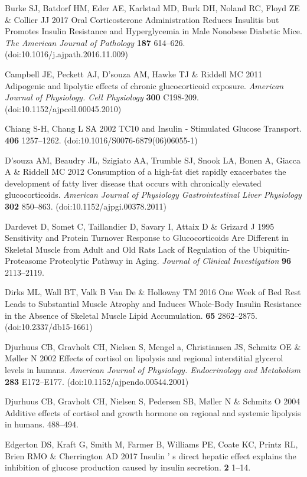 \documentclass[11pt]{article} %
\begin{document}
Burke SJ, Batdorf HM, Eder AE, Karlstad MD, Burk DH, Noland RC, Floyd ZE
\& Collier JJ 2017 Oral Corticosterone Administration Reduces Insulitis
but Promotes Insulin Resistance and Hyperglycemia in Male Nonobese
Diabetic Mice. \emph{The American Journal of Pathology} \textbf{187}
614--626. (doi:10.1016/j.ajpath.2016.11.009)

Campbell JE, Peckett AJ, D'souza AM, Hawke TJ \& Riddell MC 2011
Adipogenic and lipolytic effects of chronic glucocorticoid exposure.
\emph{American Journal of Physiology. Cell Physiology} \textbf{300}
C198-209. (doi:10.1152/ajpcell.00045.2010)

Chiang S-H, Chang L SA 2002 TC10 and Insulin ‐ Stimulated Glucose
Transport. \textbf{406} 1257--1262. (doi:10.1016/S0076-6879(06)06055-1)

D'souza AM, Beaudry JL, Szigiato AA, Trumble SJ, Snook LA, Bonen A,
Giacca A \& Riddell MC 2012 Consumption of a high-fat diet rapidly
exacerbates the development of fatty liver disease that occurs with
chronically elevated glucocorticoids. \emph{American Journal of
Physiology Gastrointestinal Liver Physiology} \textbf{302} 850--863.
(doi:10.1152/ajpgi.00378.2011)

Dardevet D, Somet C, Taillandier D, Savary I, Attaix D \& Grizard J 1995
Sensitivity and Protein Turnover Response to Glucocorticoids Are
Different in Skeletal Muscle from Adult and Old Rats Lack of Regulation
of the Ubiquitin-Proteasome Proteolytic Pathway in Aging. \emph{Journal
of Clinical Investigation} \textbf{96} 2113--2119.

Dirks ML, Wall BT, Valk B Van De \& Holloway TM 2016 One Week of Bed
Rest Leads to Substantial Muscle Atrophy and Induces Whole-Body Insulin
Resistance in the Absence of Skeletal Muscle Lipid Accumulation.
\textbf{65} 2862--2875. (doi:10.2337/db15-1661)

Djurhuus CB, Gravholt CH, Nielsen S, Mengel a, Christiansen JS, Schmitz
OE \& Møller N 2002 Effects of cortisol on lipolysis and regional
interstitial glycerol levels in humans. \emph{American Journal of
Physiology. Endocrinology and Metabolism} \textbf{283} E172--E177.
(doi:10.1152/ajpendo.00544.2001)

Djurhuus CB, Gravholt CH, Nielsen S, Pedersen SB, Møller N \& Schmitz O
2004 Additive effects of cortisol and growth hormone on regional and
systemic lipolysis in humans. 488--494.

Edgerton DS, Kraft G, Smith M, Farmer B, Williams PE, Coate KC, Printz
RL, Brien RMO \& Cherrington AD 2017 Insulin ' s direct hepatic effect
explains the inhibition of glucose production caused by insulin
secretion. \textbf{2} 1--14.
\end{document}

